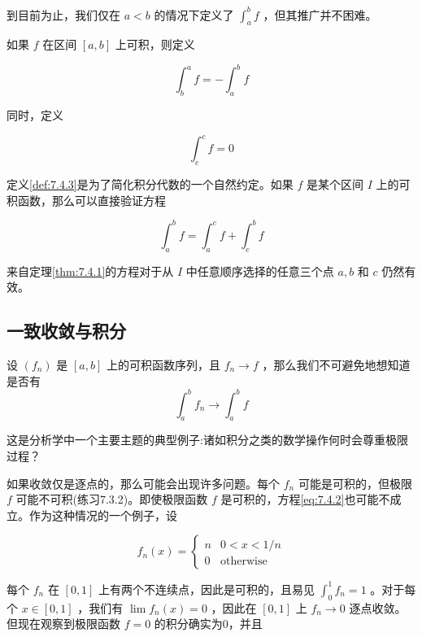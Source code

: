 到目前为止，我们仅在 $a<b$ 的情况下定义了 \({\int }_{a}^{b}f\) ，但其推广并不困难。


\begin{Def}\label{def:7.4.3}
  如果 \(f\) 在区间 \(\left\lbrack  {a,b}\right\rbrack\) 上可积，则定义

\[
{\int }_{b}^{a}f =  - {\int }_{a}^{b}f
\]

同时，定义

\[
{\int }_{c}^{c}f = 0
\]

\end{Def}

定义\ref{def:7.4.3}是为了简化积分代数的一个自然约定。如果 \(f\) 是某个区间 \(I\) 上的可积函数，那么可以直接验证方程

\[
{\int }_{a}^{b}f = {\int }_{a}^{c}f + {\int }_{c}^{b}f
\]

来自定理\ref{thm:7.4.1}的方程对于从 \(I\) 中任意顺序选择的任意三个点 \(a,b\) 和 \(c\) 仍然有效。

\subsection{一致收敛与积分}

设 \(\left( {f}_{n}\right)\) 是 \(\left\lbrack  {a,b}\right\rbrack\) 上的可积函数序列，且 \({f}_{n} \rightarrow  f\) ，那么我们不可避免地想知道是否有
\begin{equation}
\label{eq:7.4.2}
{\int }_{a}^{b}{f}_{n} \rightarrow  {\int }_{a}^{b}f
\end{equation}


这是分析学中一个主要主题的典型例子:诸如积分之类的数学操作何时会尊重极限过程？

如果收敛仅是逐点的，那么可能会出现许多问题。每个 \({f}_{n}\) 可能是可积的，但极限 \(f\) 可能不可积(练习7.3.2)。即使极限函数 \(f\) 是可积的，方程\ref{eq:7.4.2}也可能不成立。作为这种情况的一个例子，设

\[
{f}_{n}\left( x\right)  = \left\{  \begin{array}{ll} n & 0 < x < 1/n \\  0 & \text{otherwise} \end{array}\right.
\]

每个 \({f}_{n}\) 在 \(\left\lbrack  {0,1}\right\rbrack\) 上有两个不连续点，因此是可积的，且易见  \({\int }_{0}^{1}{f}_{n} = 1\) 。对于每个 \(x \in  \left\lbrack  {0,1}\right\rbrack\) ，我们有 \(\lim {f}_{n}\left( x\right)  = 0\) ，因此在 \(\left\lbrack  {0,1}\right\rbrack\) 上 \({f}_{n} \rightarrow  0\) 逐点收敛。但现在观察到极限函数 \(f = 0\) 的积分确实为0，并且

